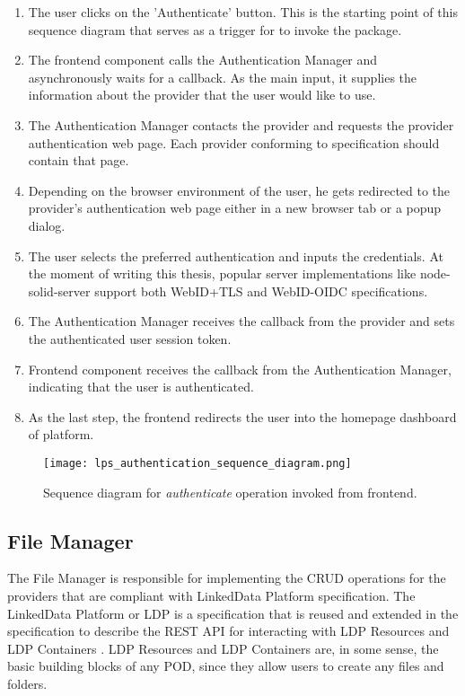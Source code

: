 \begin{enumerate}
    \item The user clicks on the 'Authenticate' button. This is the starting point of this sequence diagram that serves as a trigger for \lpa{} to invoke the \lpa{} package.
    \item The frontend component calls the Authentication Manager and asynchronously waits for a callback. As the main input, it supplies the information about the \solid{} provider that the user would like to use.
    \item The Authentication Manager contacts the \solid{} provider and requests the provider authentication web page. Each provider conforming to \solid{} specification should contain that page.
    \item Depending on the browser environment of the user, he gets redirected to the provider's authentication web page either in a new browser tab or a popup dialog.
    \item The user selects the preferred authentication and inputs the credentials. At the moment of writing this thesis, popular \solid{} server implementations like node-solid-server support both WebID+TLS and WebID-OIDC specifications.
    \item The Authentication Manager receives the callback from the provider and sets the authenticated user session token.
    \item Frontend component receives the callback from the Authentication Manager, indicating that the user is authenticated.
    \item As the last step, the frontend redirects the user into the homepage dashboard of \lpa{} platform.
\end{enumerate}


\begin{figure}[h]
\centering
\texttt{[image: lps\_authentication\_sequence\_diagram.png]}
\caption{Sequence diagram for \textit{authenticate} operation invoked from \lpa{} frontend.}
\label{fig:lps_authentication_sequence_diagram}
\end{figure}


\subsection{File Manager}
The File Manager is responsible for implementing the CRUD operations for the \solid{}  providers that are compliant with LinkedData Platform specification. The LinkedData Platform or LDP is a specification that is reused and extended in the \solid{} specification to describe the REST API for interacting with LDP Resources and LDP Containers \cite{Speicher:15:LDP}. LDP Resources and LDP Containers are, in some sense, the basic building blocks of any \solid{} POD, since they allow users to create any files and folders. 


